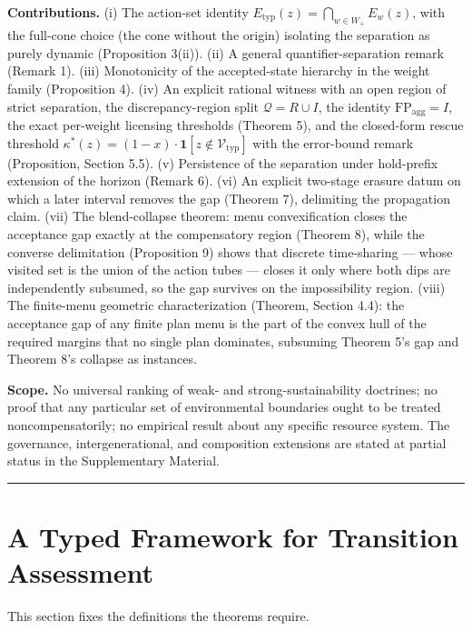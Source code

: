 \documentclass[review,11pt]{elsarticle}
\begin{document}
\textbf{Contributions.} (i) The action-set identity \(E_{\mathrm{typ}}(z) = \bigcap_{w \in W_+} E_w(z)\), with the full-cone
choice (the cone without the origin) isolating the separation as purely
dynamic (Proposition 3(ii)). (ii) A general quantifier-separation remark
(Remark 1). (iii) Monotonicity of the accepted-state hierarchy in the
weight family (Proposition 4). (iv) An explicit rational witness with an
open region of strict separation, the discrepancy-region split
\(\mathcal{Q} = R \cup I\), the identity
\(\mathrm{FP}_{\mathrm{agg}} = I\), the exact per-weight licensing thresholds (Theorem 5), and the closed-form rescue threshold \(\kappa^*(z) = (1 - x)\cdot\mathbf{1}[z \notin \mathcal{V}_{\mathrm{typ}}]\) with the error-bound remark (Proposition, Section 5.5). (v) Persistence of the separation under
hold-prefix extension of the horizon (Remark 6). (vi) An explicit
two-stage erasure datum on which a later interval removes the gap
(Theorem 7), delimiting the propagation claim. (vii) The blend-collapse
theorem: menu convexification closes the acceptance gap exactly at the compensatory region (Theorem 8), while the converse
delimitation (Proposition 9) shows that discrete time-sharing --- whose
visited set is the union of the action tubes --- closes it only where
both dips are independently subsumed, so the gap survives on the
impossibility region. (viii) The finite-menu geometric characterization
(Theorem, Section 4.4): the acceptance gap of any finite plan menu is
the part of the convex hull of the required margins that no single plan
dominates, subsuming Theorem 5's gap and Theorem 8's collapse as
instances.

\textbf{Scope.} No universal ranking of weak- and strong-sustainability doctrines; no proof that any particular set of environmental boundaries ought to be treated noncompensatorily; no empirical result about any specific resource system. The governance, intergenerational, and composition extensions are stated at partial status in the Supplementary Material.

\begin{center}\rule{0.5\linewidth}{0.5pt}\end{center}

\section{A Typed Framework for Transition
Assessment}\label{a-typed-framework-for-transition-assessment}

This section fixes the definitions the theorems require.
\end{document}
